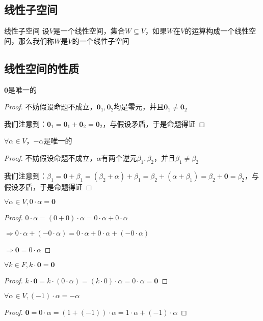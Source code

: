 \documentclass[12pt, a4paper, oneside, UTF8]{ctexbook}
\begin{document}
		\subsection{线性子空间}
			\begin{defn}{线性子空间}{}
				设$V$是一个线性空间，集合$W \subseteq V$，如果$W$在$V$的运算构成一个线性空间，那么我们称$W$是$V$的一个线性子空间
			\end{defn}
		\subsection{线性空间的性质}
		\begin{para}{0}
			\point{}
				\begin{proposition}
					$\mathbf{0}$是唯一的
				\end{proposition}
				\begin{proof}
					不妨假设命题不成立，$\mathbf{0}_1,\mathbf{0}_2$均是零元，并且$\mathbf{0}_1 \neq \mathbf{0}_2$

					我们注意到：$\mathbf{0}_1 = \mathbf{0}_1 + \mathbf{0}_2 = \mathbf{0}_2$，与假设矛盾，于是命题得证
				\end{proof}
			\point{}
				\begin{proposition}
					$\forall \alpha \in V$，$-\alpha $是唯一的
				\end{proposition}
				\begin{proof}
					不妨假设命题不成立，$\alpha $有两个逆元$\beta_1,\beta_2$，并且$\beta_1 \neq \beta_2$

					我们注意到：$\beta_1 = \mathbf{0} + \beta_1 = (\beta_2 + \alpha )+\beta_1 = \beta_2 + (\alpha +\beta_1) = \beta_2 + \mathbf{0}= \beta_2$，与假设矛盾，于是命题得证
				\end{proof}
			\point{}
				\begin{proposition}
					$\forall \alpha \in V,0\cdot \alpha = \mathbf{0}$
				\end{proposition}
				\begin{proof}
					$0\cdot \alpha =(0+0)\cdot \alpha =0\cdot \alpha +0\cdot \alpha $

					$\Rightarrow 0\cdot \alpha + (-0\cdot \alpha )=0\cdot \alpha + 0\cdot \alpha +(-0\cdot \alpha )$

					$\Rightarrow \mathbf{0} = 0\cdot \alpha $
				\end{proof}
			\point{}
				\begin{proposition}
					$\forall k \in F,k \cdot \mathbf{0} = \mathbf{0}$
				\end{proposition}
				\begin{proof}
					$k \cdot \mathbf{0} = k\cdot (0\cdot \alpha ) = (k\cdot 0)\cdot \alpha = 0\cdot \alpha = \mathbf{0}$
				\end{proof}
			\point{}
				\begin{proposition}
					$\forall \alpha \in V,(-1)\cdot \alpha = -\alpha $
				\end{proposition}
				\begin{proof}
					$\mathbf{0} = 0\cdot \alpha =\left(1+(-1)\right)\cdot \alpha =1\cdot \alpha + (-1)\cdot \alpha $


\end{proof}
\end{para}
\end{document}
